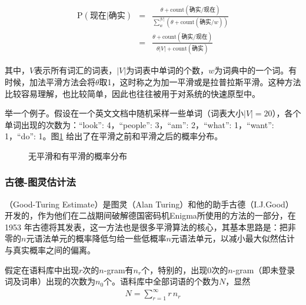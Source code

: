 \begin{eqnarray}
\textrm{P}(\textrm{现在}|\textrm{确实}) & =  & \frac{\theta + \textrm{count}(\textrm{确实/现在})}{\sum_{w}^{|V|}(\theta + \textrm{count}(\textrm{确实/}w))} \nonumber \\
                                                             & =  & \frac{\theta + \textrm{count}(\textrm{确实/现在})}{\theta{|V|} + \textrm{count}(\textrm{确实})}
\label{eq:2-27}
\end{eqnarray}

\noindent 其中，$V$表示所有词汇的词表，$|V|$为词表中单词的个数，$w$为词典中的一个词。有时候，加法平滑方法会将$\theta$取1，这时称之为加一平滑或是拉普拉斯平滑。这种方法比较容易理解，也比较简单，因此也往往被用于对系统的快速原型中。

\parinterval 举一个例子。假设在一个英文文档中随机采样一些单词（词表大小$|V|=20$），各个单词出现的次数为：``look'': 4，``people'': 3，``am'': 2，``what'': 1，``want'': 1，``do'': 1。图\ref{fig:2-19} 给出了在平滑之前和平滑之后的概率分布。

\begin{figure}[htp]
    \centering
 	
	\caption{无平滑和有平滑的概率分布}
    \label{fig:2-19}
\end{figure}


\subsubsection{古德-图灵估计法}

（Good-Turing Estimate）是图灵（Alan Turing）和他的助手古德（I.J.Good）开发的，作为他们在二战期间破解德国密码机Enigma所使用的方法的一部分，在1953 年古德将其发表，这一方法也是很多平滑算法的核心，其基本思路是：把非零的$n$元语法单元的概率降低匀给一些低概率$n$元语法单元，以减小最大似然估计与真实概率之间的偏离\cite{good1953population}\cite{gale1995good}。

\parinterval 假定在语料库中出现$r$次的$n$-gram有$n_r$个，特别的，出现0次的$n$-gram（即未登录词及词串）出现的次数为$n_0$个。语料库中全部词语的个数为$N$，显然
\begin{eqnarray}
N = \sum_{r=1}^{\infty}{r\,n_r}
\label{eq:2-28}
\end{eqnarray}

